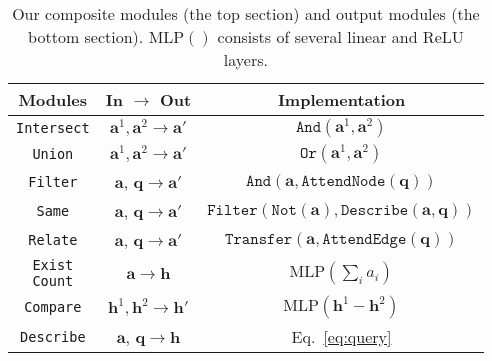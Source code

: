 \documentclass[10pt,twocolumn,letterpaper]{article}
\begin{document}
\begin{table}[h]
    \caption{Our composite modules (the top section) and output modules (the bottom section). $\mathrm{MLP}()$ consists of several linear and ReLU layers.}
    \centering
    \footnotesize
    \begin{tabular}{|c|c|c|}
    \hline
    Modules & In $\to$ Out & Implementation \\
    \hline
    \texttt{Intersect}    & $\mathbf{a}^1, \mathbf{a}^2 \to \mathbf{a}'$       & $\texttt{And}(\mathbf{a}^1, \mathbf{a}^2)$ \\
    \texttt{Union}     & $\mathbf{a}^1, \mathbf{a}^2 \to \mathbf{a}'$          & $\texttt{Or}(\mathbf{a}^1, \mathbf{a}^2)$ \\
    \texttt{Filter}     & $\mathbf{a}$, $\mathbf{q} \to \mathbf{a}'$     & $\texttt{And}(\mathbf{a},  \texttt{AttendNode}(\mathbf{q}))$ \\
    \texttt{Same}       & $\mathbf{a}$, $\mathbf{q} \to \mathbf{a}'$     & {\fontsize{7}{7}\selectfont $\texttt{Filter}(\texttt{Not}(\mathbf{a}), \texttt{Describe}(\mathbf{a}, \mathbf{q}))$} \\
    \texttt{Relate}     & $\mathbf{a}$, $\mathbf{q} \to \mathbf{a}'$     & {\fontsize{7.7}{7.7}\selectfont $\texttt{Transfer}(\mathbf{a}, \texttt{AttendEdge}(\mathbf{q}))$} \\
    \hline
    \hline
    \specialcell[c]{\texttt{Exist} \\ \texttt{Count}}     & $\mathbf{a} \to \mathbf{h}$	       & $\mathrm{MLP}(\sum_i a_i)$\\
    \texttt{Compare}     & $\mathbf{h}^1, \mathbf{h}^2 \to \mathbf{h}'$    & $\mathrm{MLP}(\mathbf{h}^1 - \mathbf{h}^2)$ \\
    \texttt{Describe}  & $\mathbf{a}$, $\mathbf{q} \to \mathbf{h}$    & Eq.~\eqref{eq:query}\\
    
    \hline
    \end{tabular}
    \label{tab:modules}
\vspace{-0.4cm}
\end{table}
\end{document}
